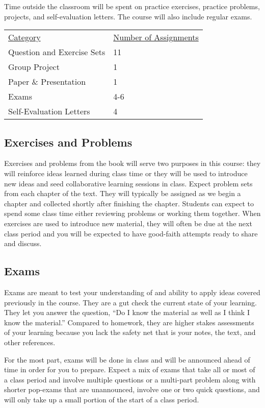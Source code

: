 \documentclass[10pt]{article}
\begin{document}
Time outside the classroom will be spent on practice exercises, practice problems, projects, and self-evaluation letters. The course will also include regular exams.
\begin{center}
  \begin{tabular}{ll}
    \underline{Category} & \underline{Number of Assignments} \\
    Question and Exercise Sets &  11 \\
    Group Project & 1 \\
    Paper \& Presentation &  1 \\
    Exams & 4-6\\
    Self-Evaluation Letters & 4 \\
  \end{tabular}
\end{center}

\subsection*{Exercises and Problems}

Exercises and problems from the book will serve two purposes in this course: they will reinforce ideas learned during class time or they will be used to introduce new ideas and seed collaborative learning sessions in class.  Expect problem sets from each chapter of the text.  They will typically be assigned as we begin a chapter and collected shortly after finishing the chapter. Students can expect to spend some class time either reviewing problems or working them together. When exercises are used to introduce new material, they will often be due at the next class period and you will be expected to have good-faith attempts ready to share and discuss.

\subsection*{Exams}

Exams are meant to test your understanding of and ability to apply ideas covered previously in the course. They are a gut check the current state of your learning. They let you answer the question, ``Do I know the material as well as I think I know the material.''  Compared to homework, they are higher stakes assessments of your learning because you lack the safety net that is your notes, the text, and other references.

For the most part, exams will be done in class and will be announced ahead of time in order for you to prepare.  Expect a mix of exams that take all or most of a class period and involve multiple questions or a multi-part problem along with shorter pop-exams that are unannounced, involve one or two quick questions, and will only take up a small portion of the start of a class period.
\end{document}
